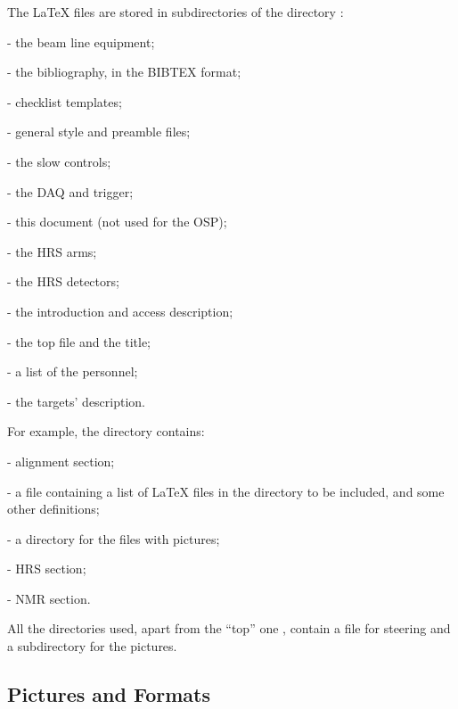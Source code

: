 \documentclass[12pt,letterpaper]{article}
\begin{document}
  The \LaTeX{} files are stored in subdirectories of the directory
  :
  \begin{list}{}{\setlength{\itemsep}{-0.15cm}}
    \item {} - the beam line equipment;
    \item {} - the bibliography, in the BIBTEX format;
    \item {} - checklist templates;
    \item {} - general style and preamble files;
    \item {} - the slow controls;
    \item {} - the DAQ and trigger;
    \item {} - this document (not used for the OSP);
    \item {} - the HRS arms;
    \item {} - the HRS detectors;
    \item {} - the introduction and access description;
    \item {} - the top file and the title;
    \item {} - a list of the personnel;
    \item {} - the targets' description.
  \end{list}

 For example, the directory  contains:
  \begin{list}{}{\setlength{\itemsep}{-0.15cm}}
    \item {} - alignment section;
    \item {} - a file containing a list of \LaTeX{} files in
           the directory to be included, and some other definitions;
    \item {} - a directory for the files with pictures;
    \item {} - HRS section;
    \item {} - NMR section.
  \end{list}
 
 All the directories used, apart from the ``top'' one ,
 contain a file  for steering and a subdirectory
  for the pictures.

\subsection{Pictures and Formats}
\label{sec:pictures}
\end{document}
